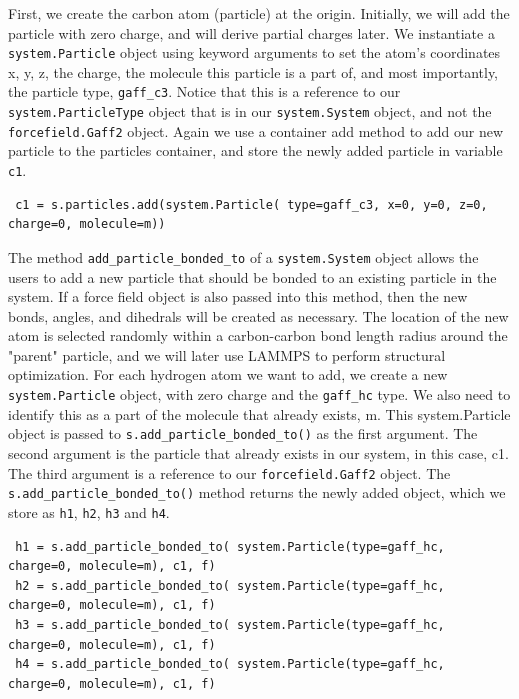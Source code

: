 \documentclass[9pt,tutorial]{livecoms}
\begin{document}
First, we create the carbon atom (particle) at the origin. Initially, we will add the particle with zero charge, and will derive partial charges later. We instantiate a \lstinline$system.Particle$ object using keyword arguments to set the atom's coordinates x, y, z, the charge, the molecule this particle is a part of, and most importantly, the particle type, \lstinline$gaff_c3$. Notice that this is a reference to our \lstinline$system.ParticleType$ object that is in our \lstinline$system.System$ object, and not the \lstinline$forcefield.Gaff2$ object. Again we use a container add method to add our new particle to the particles container, and store the newly added particle in variable \lstinline$c1$.

\begin{lstlisting}
 c1 = s.particles.add(system.Particle( type=gaff_c3, x=0, y=0, z=0, charge=0, molecule=m))
\end{lstlisting}

The method \lstinline$add_particle_bonded_to$ of a \lstinline$system.System$ object allows the users to add a new particle that should be bonded to an existing particle in the system. If a force field object is also passed into this method, then the new bonds, angles, and dihedrals will be created as necessary. The location of the new atom is selected randomly within a carbon-carbon bond length radius around the "parent" particle, and we will later use LAMMPS to perform structural optimization. For each hydrogen atom we want to add, we create a new \lstinline$system.Particle$ object, with zero charge and the \lstinline$gaff_hc$ type. We also need to identify this as a part of the molecule that already exists, m. This system.Particle object is passed to \lstinline$s.add_particle_bonded_to()$ as the first argument. The second argument is the particle that already exists in our system, in this case, c1. The third argument is a reference to our \lstinline$forcefield.Gaff2$ object. The \lstinline$s.add_particle_bonded_to()$ method returns the newly added object, which we store as \lstinline$h1$, \lstinline$h2$, \lstinline$h3$ and \lstinline$h4$.

\begin{lstlisting}
 h1 = s.add_particle_bonded_to( system.Particle(type=gaff_hc, charge=0, molecule=m), c1, f)
 h2 = s.add_particle_bonded_to( system.Particle(type=gaff_hc, charge=0, molecule=m), c1, f)
 h3 = s.add_particle_bonded_to( system.Particle(type=gaff_hc, charge=0, molecule=m), c1, f)
 h4 = s.add_particle_bonded_to( system.Particle(type=gaff_hc, charge=0, molecule=m), c1, f)
\end{lstlisting}
\end{document}
